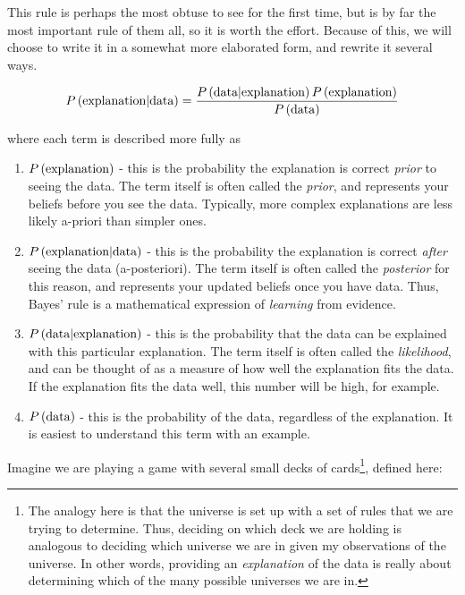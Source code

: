 \documentclass{tufte-book}
\begin{document}
This rule is perhaps the most obtuse to see for the first time, but is
by far the most important rule of them all, so it is worth the effort.
Because of this, we will choose to write it in a somewhat more
elaborated form, and rewrite it several ways.

\begin{eqnarray*}
\Pg{explanation}{data} = \frac{\Pg{data}{explanation}\P{explanation}}{\P{data}}
\end{eqnarray*}

where each term is described more fully as

\begin{enumerate}
\def\labelenumi{\arabic{enumi}.}
\itemsep1pt\parskip0pt
\item
  \(\P{explanation}\) - this is the probability the explanation is
  correct \emph{prior} to seeing the data. The term itself is often
  called the \emph{prior}, and represents your beliefs before you see
  the data. Typically, more complex explanations are less likely
  a-priori than simpler ones.\\
\item
  \(\Pg{explanation}{data}\) - this is the probability the explanation
  is correct \emph{after} seeing the data (a-posteriori). The term
  itself is often called the \emph{posterior} for this reason, and
  represents your updated beliefs once you have data. Thus, Bayes' rule
  is a mathematical expression of \emph{learning} from evidence.\\
\item
  \(\Pg{data}{explanation}\) - this is the probability that the data can
  be explained with this particular explanation. The term itself is
  often called the \emph{likelihood}, and can be thought of as a measure
  of how well the explanation fits the data. If the explanation fits the
  data well, this number will be high, for example.
\item
  \(\P{data}\) - this is the probability of the data, regardless of the
  explanation. It is easiest to understand this term with an example.
\end{enumerate}

Imagine we are playing a game with several small decks of
cards\footnote{The analogy here is that the universe is set up with a
  set of rules that we are trying to determine. Thus, deciding on which
  deck we are holding is analogous to deciding which universe we are in
  given my observations of the universe. In other words, providing an
  \emph{explanation} of the data is really about determining which of
  the many possible universes we are in.}, defined here:
\end{document}
